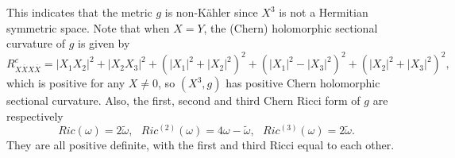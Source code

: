 \documentclass{amsart}
\numberwithin{equation}{section}
\theoremstyle{definition}
\renewcommand{\1}{\mathds{1}}
\renewcommand{\>}{\rightarrow}
\begin{document}
This indicates that the metric $g$ is non-K\"ahler since $X^3$ is not a Hermitian symmetric space. Note that when $X=Y$, the (Chern) holomorphic sectional curvature of $g$ is given by
\begin{equation*}
 R^c_{X\overline{X}X\overline{X}} =  |X_1X_2|^2 + |X_2X_3|^2 + (|X_1|^2  + |X_2|^2)^2 + (|X_1|^2 - |X_3|^2)^2 + (|X_2|^2 + |X_3|^2)^2,
\end{equation*}
which is positive for any $X\neq 0$, so $(X^3,g)$ has positive Chern holomorphic sectional curvature. Also, the first, second and third Chern Ricci form of $g$ are respectively
\begin{equation}\label{C_Ricci_Wallach}
Ric(\omega) = 2\tilde{\omega}, \ \ \  Ric^{(2)}(\omega) = 4\omega - \tilde{\omega}, \ \ \ Ric^{(3)} (\omega) = 2\tilde{\omega }.
\end{equation}
They  are all positive definite, with the first and third Ricci equal to each other.

\vspace{0.1cm}
\end{document}
